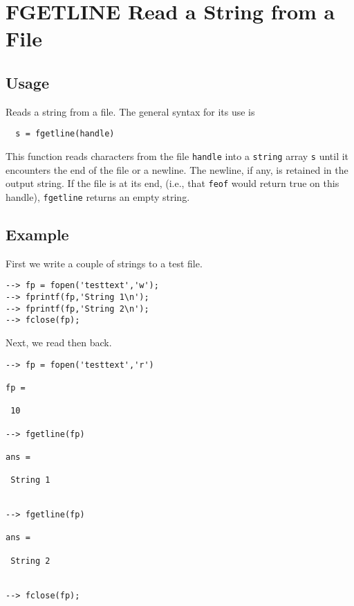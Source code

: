 \section{FGETLINE Read a String from a File}

\subsection{Usage}

Reads a string from a file.  The general syntax for its use
is
\begin{verbatim}
  s = fgetline(handle)
\end{verbatim}
This function reads characters from the file \verb|handle| into
a \verb|string| array \verb|s| until it encounters the end of the file
or a newline.  The newline, if any, is retained in the output
string.  If the file is at its end, (i.e., that \verb|feof| would
return true on this handle), \verb|fgetline| returns an empty
string.
\subsection{Example}

First we write a couple of strings to a test file.
\begin{verbatim}
--> fp = fopen('testtext','w');
--> fprintf(fp,'String 1\n');
--> fprintf(fp,'String 2\n');
--> fclose(fp);
\end{verbatim}
Next, we read then back.
\begin{verbatim}
--> fp = fopen('testtext','r')

fp = 

 10 

--> fgetline(fp)

ans = 

 String 1


--> fgetline(fp)

ans = 

 String 2


--> fclose(fp);
\end{verbatim}
